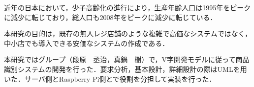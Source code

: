 


近年の日本において，少子高齢化の進行により，生産年齢人口は1995年をピークに減少に転じており，総人口も2008年をピークに減少に転じている．

本研究の目的は，既存の無人レジ店舗のような複雑で高価なシステムではなく，中小店でも導入できる安価なシステムの作成である．

本研究ではグループ（段原　丞治，真鍋　樹）で，V字開発モデルに従って商品識別システムの開発を行った．要求分析，基本設計，詳細設計の際はUMLを用いた．サーバ側とRaspberry Pi側とで役割を分担して実装を行った．